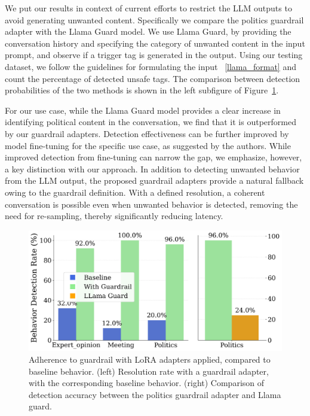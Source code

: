 \documentclass[letterpaper]{article}
\begin{document}
We put our results in context of current efforts to restrict the LLM outputs to avoid generating unwanted content. Specifically we compare the politics guardrail adapter with the Llama Guard model. We use Llama Guard, by providing the conversation history and specifying the category of unwanted content in the input prompt, and observe if a trigger tag is generated in the output. Using our testing dataset, we follow the guidelines for formulating the input ~\ref{llama_format} and count the percentage of detected unsafe tags. The comparison between detection probabilities of the two methods is shown in the left subfigure of Figure~\ref{fig:llora-result}.

For our use case, while the Llama Guard model provides a clear increase in identifying political content in the conversation, we find that it is outperformed by our guardrail adapters.
Detection effectiveness can be further improved by model fine-tuning for the specific use case, as suggested by the authors. While improved detection from fine-tuning can narrow the gap, we emphasize, however, a key distinction with our approach. In addition to detecting unwanted behavior from the LLM output, the proposed guardrail adapters provide a natural fallback owing to the guardrail definition. With a defined resolution, a coherent conversation is possible even when unwanted behavior is detected, removing the need for re-sampling, thereby significantly reducing latency.

\begin{figure}[h!]
	\centering
	\includegraphics[width=1.0\linewidth]{figures/detectionEfficiencySingle.png}
	\caption{Adherence to guardrail with LoRA adapters applied, compared to baseline behavior. 
		(left)  Resolution rate with a guardrail adapter, with the corresponding baseline behavior. 
		(right)  Comparison of detection accuracy between the politics guardrail adapter and Llama guard.}\label{fig:llora-result}
\end{figure}
\end{document}
